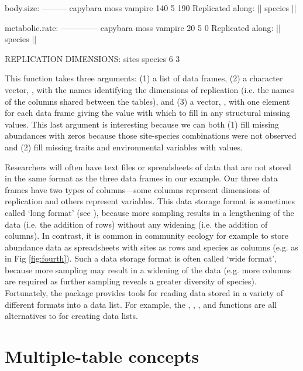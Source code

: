 \documentclass[a4paper]{report}
\begin{document}
\begin{article}
\begin{Schunk}
\begin{Soutput}
body.size:
---------
capybara     moss  vampire 
     140        5      190 
Replicated along:  || species || 


metabolic.rate:
--------------
capybara     moss  vampire 
      20        5        0 
Replicated along:  || species || 


REPLICATION DIMENSIONS: 
  sites species 
      6       3 
\end{Soutput}
\end{Schunk}
This function takes three arguments:  (1) a list of data frames, (2) a character vector, , with the names identifying the dimensions of replication (i.e. the names of the columns shared between the tables), and (3) a vector, , with one element for each data frame giving the value with which to fill in any structural missing values.  This last argument is interesting because we can both (1) fill missing abundances with zeros because those site-species combinations were not observed and (2) fill missing traits and environmental variables with  values.

Researchers will often have text files or spreadsheets of data that are not stored in the same format as the three data frames in our example.  Our three data frames have two types of columns---some columns represent dimensions of replication and others represent variables.  This data storage format is sometimes called `long format' (see ), because more sampling results in a lengthening of the data (i.e. the addition of rows) without any widening (i.e. the addition of columns).  In contrast, it is common in community ecology for example to store abundance data as spreadsheets with sites as rows and species as columns (e.g. as in Fig \ref{fig:fourth}).  Such a data storage format is often called `wide format', because more sampling may result in a widening of the data (e.g. more columns are required as further sampling reveals a greater diversity of species).  Fortunately, the  package provides tools for reading data stored in a variety of different formats into a data list.  For example, the , , , and  functions are all alternatives to  for creating data lists.

\section{Multiple-table concepts}


\end{article}
\end{document}
